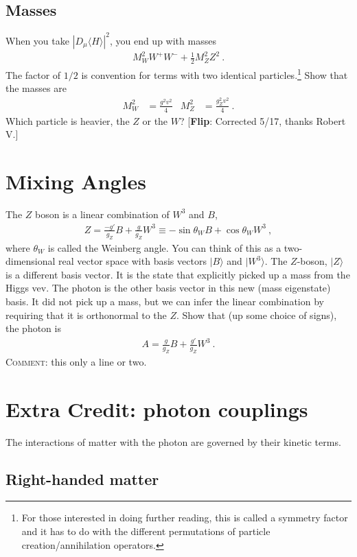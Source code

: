 \documentclass[12pt]{article}
\numberwithin{equation}{section}    %
\newcommand{\flip}[1]{{\color{red} [\textbf{Flip}: {#1}]}}
\begin{document}
\subsection{Masses }
When you take $|D_\mu \langle H\rangle|^2$, you end up with masses
\begin{align}
	M_W^2 W^+W^- + \frac{1}{2} M_Z^2 Z^2 \ .
\end{align}
The factor of $1/2$ is convention for terms with two identical particles.\footnote{For those interested in doing further reading, this is called a symmetry factor and it has to do with the different permutations of particle creation/annihilation operators.} Show that the masses are
\begin{align}
	M_W^2 &= \frac{g^2v^2}{4}
	&
	M_Z^2 &= \frac{g_Z^2v^2}{4} \ .
\end{align}
Which particle is heavier, the $Z$ or the $W$? \flip{Corrected 5/17, thanks Robert V.}

\section{Mixing Angles}

The $Z$ boson is a linear combination of $W^3$ and $B$,
\begin{align}
	Z = \frac{-g'}{g_Z} B + \frac{g}{g_Z} W^3
	\equiv
	-\sin\theta_W B + \cos\theta_W W^3 \ ,
\end{align}
where $\theta_W$ is called the Weinberg angle. You can think of this as a two-dimensional real vector space with basis vectors $|B\rangle$ and $|W^3\rangle$. The $Z$-boson, $|Z\rangle$ is a different basis vector. It is the state that explicitly picked up a mass from the Higgs vev. The photon is the other basis vector in this new (mass eigenstate) basis. It did not pick up a mass, but we can infer the linear combination by requiring that it is orthonormal to the $Z$. Show that (up some choice of signs), the photon is
\begin{align}
	A = \frac{g}{g_Z} B + \frac{g'}{g_Z} W^3 \ .
\end{align}
\textsc{Comment:} this only a line or two. 

\section*{Extra Credit: photon couplings}

The interactions of matter with the photon are governed by their kinetic terms.

\subsection*{Right-handed matter}
\end{document}
